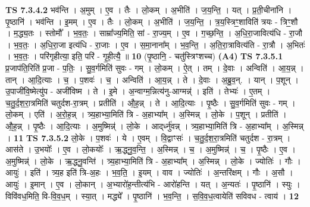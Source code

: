 \documentclass[17pt]{extarticle}
\begin{document}
                  \newline
                                \textbf{ TS 7.3.4.2} \newline
                  भव॑न्ति । अ॒मुम् । ए॒व । तैः । लो॒कम् । अ॒भीति॑ । ज॒य॒न्ति॒ । यत् । प्र॒ती॒चीना॑नि । पृ॒ष्ठानि॑ । भव॑न्ति । इ॒मम् । ए॒व । तैः । लो॒कम् । अ॒भीति॑ । ज॒य॒न्ति॒ । त्र॒य॒स्त्रिꣳ॒॒शाविति॑ त्रयः - त्रिꣳ॒॒शौ । म॒द्ध्य॒तः । स्तोमौ᳚ । भ॒व॒तः॒ । साम्रा᳚ज्य॒मिति॒ सां - रा॒ज्य॒म् । ए॒व । ग॒च्छ॒न्ति॒ । अ॒धि॒रा॒जावित्य॑धि - रा॒जौ । भ॒व॒तः॒ । अ॒धि॒रा॒जा इत्य॑धि - रा॒जाः । ए॒व । स॒मा॒नाना᳚म् । भ॒व॒न्ति॒ । अ॒ति॒रा॒त्रावित्य॑ति - रा॒त्रौ । अ॒भितः॑ । भ॒व॒तः॒ । परि॑गृहीत्या॒ इति॒ परि॑ - गृ॒ही॒त्यै॒ ॥ \textbf{  10} \newline
                  \newline
                      (पृ॒ष्ठानि॒ - चतु॑स्त्रिꣳशच्च)  \textbf{(A4)} \newline \newline
                                \textbf{ TS 7.3.5.1} \newline
                  प्र॒जाप॑ति॒रिति॑ प्र॒जा - प॒तिः॒ । सु॒व॒र्गमिति॑ सुवः - गम् । लो॒कम् । ऐ॒त् । तम् । दे॒वाः । अन्विति॑ । आ॒य॒न्न् । तान् । आ॒दि॒त्याः । च॒ । प॒शवः॑ । च॒ । अन्विति॑ । आ॒य॒न्न् । ते । दे॒वाः । अ॒ब्रु॒व॒न्. । यान् । प॒शून् । उ॒पाजी॑वि॒ष्मेत्यु॑प - अजी॑विष्म । ते । इ॒मे । अ॒न्वाग्म॒न्नित्य॑नु-आग्मन्न्॑ । इति॑ । तेभ्यः॑ । ए॒तम् । च॒तु॒र्द॒श॒रा॒त्रमिति॑ चतुर्दश-रा॒त्रम् । प्रतीति॑ । औ॒ह॒न्न् । ते । आ॒दि॒त्याः । पृ॒ष्ठैः । सु॒व॒र्गमिति॑ सुवः - गम् । लो॒कम् । एति॑ । अ॒रो॒ह॒न्न् । त्र्य॒हाभ्या॒मिति॑ त्रि - अ॒हाभ्या᳚म् । अ॒स्मिन्न् । लो॒के । प॒शून् । प्रतीति॑ । औ॒ह॒न्न् । पृ॒ष्ठैः । आ॒दि॒त्याः । अ॒मुष्मिन्न्॑ । लो॒के । आद्‌र्ध्नु॑वन्न् । त्र्य॒हाभ्या॒मिति॑ त्रि - अ॒हाभ्या᳚म् । अ॒स्मिन्न् । \textbf{  11} \newline
                  \newline
                                \textbf{ TS 7.3.5.2} \newline
                  लो॒के । प॒शवः॑ । ये । ए॒वम् । वि॒द्वाꣳसः॑ । च॒तु॒र्द॒श॒रा॒त्रमिति॑ चतुर्दश - रा॒त्रम् । आस॑ते । उ॒भयोः᳚ । ए॒व । लो॒कयोः᳚ । ऋ॒द्ध्नु॒व॒न्ति॒ । अ॒स्मिन्न् । च॒ । अ॒मुष्मिन्न्॑ । च॒ । पृ॒ष्ठैः । ए॒व । अ॒मुष्मिन्न्॑ । लो॒के । ऋ॒द्ध्नु॒वन्ति॑ । त्र्य॒हाभ्या॒मिति॑ त्रि - अ॒हाभ्या᳚म् । अ॒स्मिन्न् । लो॒के । ज्योतिः॑ । गौः । आयुः॑ । इति॑ । त्र्य॒ह इति॑ त्रि-अ॒हः । भ॒व॒ति॒ । इ॒यम् । वाव । ज्योतिः॑ । अ॒न्तरि॑क्षम् । गौः । अ॒सौ । आयुः॑ । इ॒मान् । ए॒व । लो॒कान् । अ॒भ्यारो॑ह॒न्तीत्य॑भि - आरो॑हन्ति । यत् । अ॒न्यतः॑ । पृ॒ष्ठानि॑ । स्युः । विवि॑वध॒मिति॒ वि-वि॒व॒ध॒म् । स्या॒त् । मद्ध्ये᳚ । पृ॒ष्ठानि॑ । भ॒व॒न्ति॒ । स॒वि॒व॒ध॒त्वायेति॑ सविवध - त्वाय॑ । \textbf{  12} \newline
\end{document}
